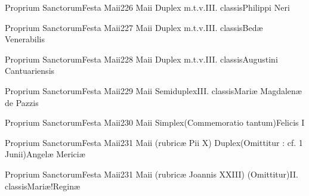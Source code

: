 \documentclass[nocturnale-romanum.tex]{subfiles}
\begin{document}
	{Proprium Sanctorum}{Festa Maii}{2}{26 Maii}
	{Duplex m.t.v.}{III. classis}{Philippi Neri}
	{}
	{}

	{Proprium Sanctorum}{Festa Maii}{2}{27 Maii}
	{Duplex m.t.v.}{III. classis}{Bedæ Venerabilis}
	{}
	{}

	{Proprium Sanctorum}{Festa Maii}{2}{28 Maii}
	{Duplex m.t.v.}{III. classis}{Augustini Cantuariensis}
	{}
	{}

	{Proprium Sanctorum}{Festa Maii}{2}{29 Maii}
	{Semiduplex}{III. classis}{Mariæ Magdalenæ de Pazzis}
	{}
	{}

	{Proprium Sanctorum}{Festa Maii}{2}{30 Maii}
	{Simplex}{(Commemoratio tantum)}{Felicis I}
	{}
	{}

	{Proprium Sanctorum}{Festa Maii}{2}{31 Maii (rubricæ Pii X)}
	{Duplex}{(Omittitur : cf. 1 Junii)}{Angelæ Mericiæ}
	{}
	{}

	{Proprium Sanctorum}{Festa Maii}{2}{31 Maii (rubricæ Joannis XXIII)}
	{(Omittitur)}{II. classis}{Mariæ!Reginæ}
	{}
	{}
\end{document}
